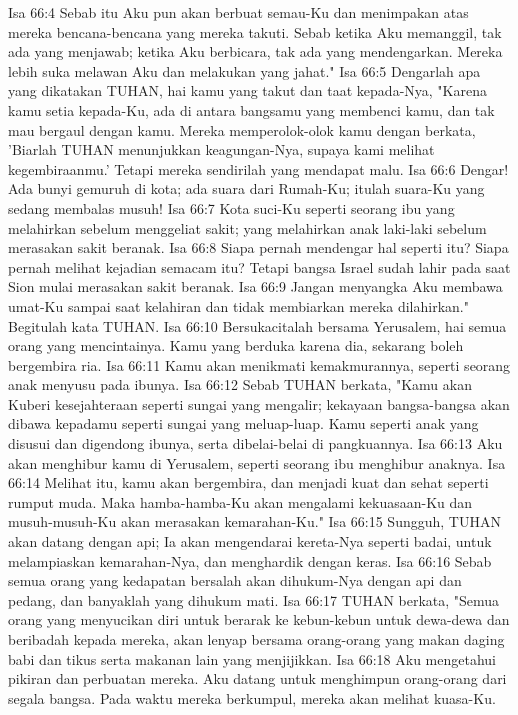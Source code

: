 Isa 66:4  Sebab itu Aku pun akan berbuat semau-Ku dan menimpakan atas mereka bencana-bencana yang mereka takuti. Sebab ketika Aku memanggil, tak ada yang menjawab; ketika Aku berbicara, tak ada yang mendengarkan. Mereka lebih suka melawan Aku dan melakukan yang jahat."
Isa 66:5  Dengarlah apa yang dikatakan TUHAN, hai kamu yang takut dan taat kepada-Nya, "Karena kamu setia kepada-Ku, ada di antara bangsamu yang membenci kamu, dan tak mau bergaul dengan kamu. Mereka memperolok-olok kamu dengan berkata, 'Biarlah TUHAN menunjukkan keagungan-Nya, supaya kami melihat kegembiraanmu.' Tetapi mereka sendirilah yang mendapat malu.
Isa 66:6  Dengar! Ada bunyi gemuruh di kota; ada suara dari Rumah-Ku; itulah suara-Ku yang sedang membalas musuh!
Isa 66:7  Kota suci-Ku seperti seorang ibu yang melahirkan sebelum menggeliat sakit; yang melahirkan anak laki-laki sebelum merasakan sakit beranak.
Isa 66:8  Siapa pernah mendengar hal seperti itu? Siapa pernah melihat kejadian semacam itu? Tetapi bangsa Israel sudah lahir pada saat Sion mulai merasakan sakit beranak.
Isa 66:9  Jangan menyangka Aku membawa umat-Ku sampai saat kelahiran dan tidak membiarkan mereka dilahirkan." Begitulah kata TUHAN.
Isa 66:10  Bersukacitalah bersama Yerusalem, hai semua orang yang mencintainya. Kamu yang berduka karena dia, sekarang boleh bergembira ria.
Isa 66:11  Kamu akan menikmati kemakmurannya, seperti seorang anak menyusu pada ibunya.
Isa 66:12  Sebab TUHAN berkata, "Kamu akan Kuberi kesejahteraan seperti sungai yang mengalir; kekayaan bangsa-bangsa akan dibawa kepadamu seperti sungai yang meluap-luap. Kamu seperti anak yang disusui dan digendong ibunya, serta dibelai-belai di pangkuannya.
Isa 66:13  Aku akan menghibur kamu di Yerusalem, seperti seorang ibu menghibur anaknya.
Isa 66:14  Melihat itu, kamu akan bergembira, dan menjadi kuat dan sehat seperti rumput muda. Maka hamba-hamba-Ku akan mengalami kekuasaan-Ku dan musuh-musuh-Ku akan merasakan kemarahan-Ku."
Isa 66:15  Sungguh, TUHAN akan datang dengan api; Ia akan mengendarai kereta-Nya seperti badai, untuk melampiaskan kemarahan-Nya, dan menghardik dengan keras.
Isa 66:16  Sebab semua orang yang kedapatan bersalah akan dihukum-Nya dengan api dan pedang, dan banyaklah yang dihukum mati.
Isa 66:17  TUHAN berkata, "Semua orang yang menyucikan diri untuk berarak ke kebun-kebun untuk dewa-dewa dan beribadah kepada mereka, akan lenyap bersama orang-orang yang makan daging babi dan tikus serta makanan lain yang menjijikkan.
Isa 66:18  Aku mengetahui pikiran dan perbuatan mereka. Aku datang untuk menghimpun orang-orang dari segala bangsa. Pada waktu mereka berkumpul, mereka akan melihat kuasa-Ku.
